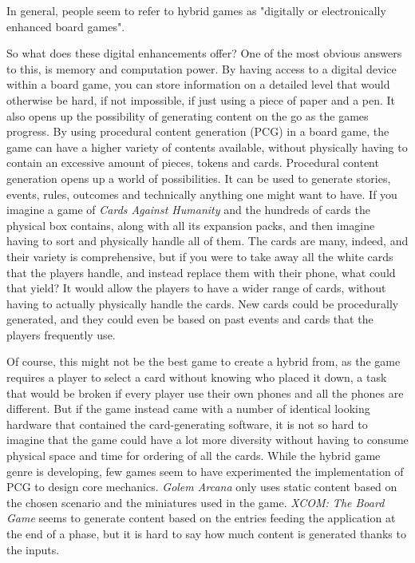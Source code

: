 In general, people seem to refer to hybrid games as "digitally or electronically enhanced board games". 


So what does these digital enhancements offer? One of the most obvious answers to this, is memory and computation power. By having access to a digital device within a board game, you can store information on a detailed level that would otherwise be hard, if not impossible, if just using a piece of paper and a pen. 
It also opens up the possibility of generating content on the go as the games progress. By using procedural content generation (PCG) in a board game, the game can have a higher variety of contents available, without physically having to contain an excessive amount of pieces, tokens and cards. 
Procedural content generation opens up a world of possibilities. It can be used to generate stories, events, rules, outcomes and technically anything one might want to have. If you imagine a game of \textit{Cards Against Humanity}\cite{game:cah} and the hundreds of cards the physical box contains, along with all its expansion packs, and then imagine having to sort and physically handle all of them. The cards are many, indeed, and their variety is comprehensive, but if you were to take away all the white cards that the players handle, and instead replace them with their phone, what could that yield? It would allow the players to have a wider range of cards, without having to actually physically handle the cards. New cards could be procedurally generated, and they could even be based on past events and cards that the players frequently use. 

Of course, this might not be the best game to create a hybrid from, as the game requires a player to select a card without knowing who placed it down, a task that would be broken if every player use their own phones and all the phones are different. But if the game instead came with a number of identical looking hardware that contained the card-generating software, it is not so hard to imagine that the game could have a lot more diversity without having to consume physical space and time for ordering of all the cards.
While the hybrid game genre is developing, few games seem to have experimented the implementation of PCG to design core mechanics. 
\textit{Golem Arcana} only uses static content based on the chosen scenario and the miniatures used in the game.
\textit{XCOM: The Board Game} seems to generate content based on the entries feeding the application at the end of a phase, but it is hard to say how much content is generated thanks to the inputs. 

